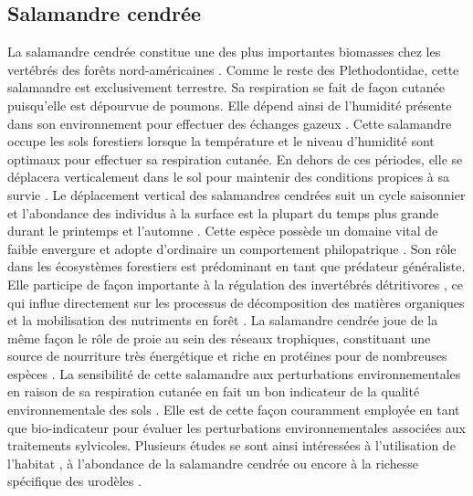 \subsection*{Salamandre cendrée}

La salamandre cendrée constitue une des plus importantes biomasses chez les vertébrés des forêts nord-américaines \citep{Burton1975Salamanderpopulations,Petranka1993Effectstimber,semlitschAbundanceBiomassProduction2014a}.
Comme le reste des Plethodontidae, cette salamandre est exclusivement terrestre. Sa respiration se fait de façon cutanée puisqu'elle est dépourvue de poumons. 
Elle dépend ainsi de l'humidité présente dans son environnement pour effectuer des échanges gazeux \citep{Heatwole1961Relationsubstrate}. 
Cette salamandre occupe les sols forestiers lorsque la température et le niveau d'humidité sont optimaux pour effectuer sa respiration cutanée. 
En dehors de ces périodes, elle se déplacera verticalement dans le sol pour maintenir des conditions propices à sa survie \citep{Grizzell1949HibernationSite}.  
Le déplacement vertical des salamandres cendrées suit un cycle saisonnier et l'abondance des individus à la surface est la plupart du temps plus grande durant le printemps et l'automne \citep{FraserEmpiricalEvaluation1976,Jaeger1980MicrohabitatsTerrestrial}.
Cette espèce possède un domaine vital de faible envergure et adopte d'ordinaire un comportement philopatrique \citep{Yurewicz2004ResourceAvailability}.
Son rôle dans les écosystèmes forestiers est prédominant en tant que prédateur généraliste. 
Elle participe de façon importante à la régulation des invertébrés détritivores \citep{Burton1975Energyflow,Hickerson2017Easternredbacked,Walton2013Topdownregulation}, 
ce qui influe directement sur les processus de décomposition des matières organiques et la mobilisation des nutriments en forêt \citep{Burton1975Energyflow,Wyman1998Experimentalassessment}. 
La salamandre cendrée joue de la même façon le rôle de proie au sein des réseaux trophiques, constituant une source de nourriture très énergétique et riche en protéines pour de nombreuses espèces \citep{Burton1975Energyflow,Pough1987abundancesalamanders}.
La sensibilité de cette salamandre aux perturbations environnementales en raison de sa respiration cutanée en fait un bon indicateur de la qualité environnementale des sols \citep{Welsh2001caseusing}.
Elle est de cette façon couramment employée en tant que bio-indicateur pour évaluer les perturbations environnementales associées aux traitements sylvicoles.
Plusieurs études se sont ainsi intéressées à l'utilisation de l'habitat \citep{Baecher2018Environmentalgradients,gibbsDistributionWoodlandAmphibians1998,Heatwole1962EnvironmentalFactors,Mossman2019Twosalamander}, 
à l'abondance de la salamandre cendrée \citep{Harpole1999Effectsseven,Hocking2013Effectsexperimental,Homyack2009Longtermeffects,Grialou2000effectsforest,Mazerolle2021Woodlandsalamander} 
ou encore à la richesse spécifique des urodèles \citep{Petranka1993Effectstimber,Welsh2001caseusing}.


